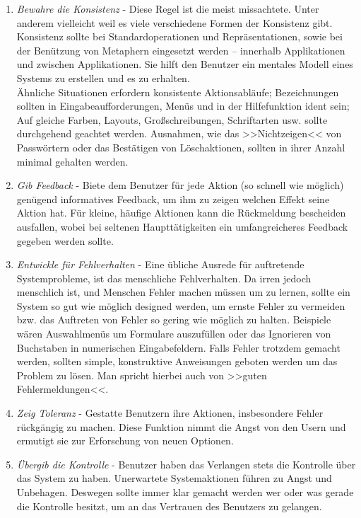\begin{small}
\begin{enumerate}
	\item \emph{Bewahre die Konsistenz} - Diese Regel ist die meist missachtete. Unter anderem vielleicht weil es viele verschiedene Formen der Konsistenz gibt. Konsistenz sollte bei Standardoperationen und Repräsentationen, sowie bei der Benützung von Metaphern eingesetzt werden – innerhalb Applikationen und zwischen Applikationen. Sie hilft den	Benutzer ein mentales Modell eines Systems zu erstellen und es zu erhalten.\\
Ähnliche Situationen erfordern konsistente Aktionsabläufe; Bezeichnungen sollten in	Eingabeaufforderungen, Menüs und in der Hilfefunktion ident sein; Auf gleiche Farben, Layouts, Großschreibungen, Schriftarten usw. sollte durchgehend geachtet werden. Ausnahmen, wie das >>Nichtzeigen<< von Passwörtern oder das Bestätigen von Löschaktionen, sollten in ihrer Anzahl minimal gehalten werden.
	\item \emph{Gib Feedback} - Biete dem Benutzer für jede Aktion (so schnell wie möglich) genügend informatives Feedback, um ihm zu zeigen welchen Effekt seine Aktion hat. Für kleine, häufige Aktionen kann die Rückmeldung bescheiden ausfallen, wobei bei seltenen Haupttätigkeiten ein umfangreicheres Feedback gegeben werden sollte.
	\item \emph{Entwickle für Fehlverhalten} - Eine übliche Ausrede für auftretende Systemprobleme, ist das menschliche Fehlverhalten. Da irren jedoch menschlich ist, und Menschen Fehler machen müssen um zu lernen, sollte ein System so gut wie möglich designed werden, um	ernste Fehler zu vermeiden bzw. das Auftreten von Fehler so gering wie möglich zu halten. Beispiele wären Auswahlmenüs um Formulare auszufüllen oder das Ignorieren von	Buchstaben in numerischen Eingabefeldern. Falls Fehler trotzdem gemacht werden,	sollten simple, konstruktive Anweisungen geboten werden um das Problem zu lösen. Man	spricht hierbei auch von >>guten Fehlermeldungen<<.
	\item \emph{Zeig Toleranz} - Gestatte Benutzern ihre Aktionen, insbesondere Fehler rückgängig zu machen. Diese Funktion nimmt die Angst von den Usern und ermutigt sie zur Erforschung von neuen Optionen.
	\item \emph{Übergib die Kontrolle} - Benutzer haben das Verlangen stets die Kontrolle über das	System zu haben. Unerwartete Systemaktionen führen zu Angst und Unbehagen. Deswegen sollte immer klar gemacht werden wer oder was gerade die Kontrolle besitzt,	um an das Vertrauen des Benutzers zu gelangen.

\end{enumerate}
\end{small}

